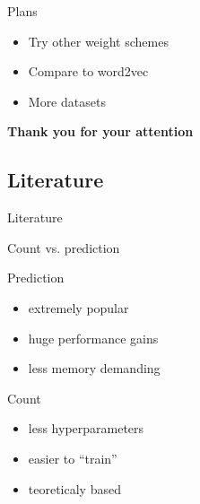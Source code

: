 \documentclass[xcolor={table}]{beamer}
\begin{document}
\begin{frame}{Plans}
    \begin{block}{}
        \begin{itemize}   
            \item Try other weight schemes
            \item Compare to word2vec
            \item More datasets 
        \end{itemize}
    \end{block}
\end{frame} 


\begin{frame}
    \vfill
    \begin{center}
        \huge\bfseries
        Thank you for your attention
        \vfill
    \end{center}
    \vfill
\end{frame}

\appendix

        \subsection{Literature}                
            \begin{frame}[allowframebreaks]{Literature}
            \footnotesize
                \nocite{*}
                
                 
            \end{frame}

\begin{frame}{Count vs. prediction}
    \begin{block}{Prediction}
        \begin{itemize}
            \item extremely popular
            \item huge performance gains
            \item less memory demanding
        \end{itemize}
    \end{block}

    \begin{block}{Count}
        \begin{itemize}
            \item less hyperparameters
            \item easier to ``train''
            \item teoreticaly based
        \end{itemize}
    \end{block}
\end{frame}
\end{document}
